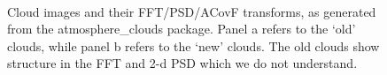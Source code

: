 \documentclass[11pt,preprint]{aastex}
\begin{document}
\begin{figure}[htbp]
\centering
{} \\
\caption{{\small
Cloud images and their FFT/PSD/ACovF transforms, as generated from the atmosphere\_clouds package. Panel a refers to the `old' clouds, while panel b refers to the `new' clouds. The old clouds show structure in the FFT and 2-d PSD which we do not understand.}}
\label{fig:clouds_transforms}
\end{figure}
\end{document}
